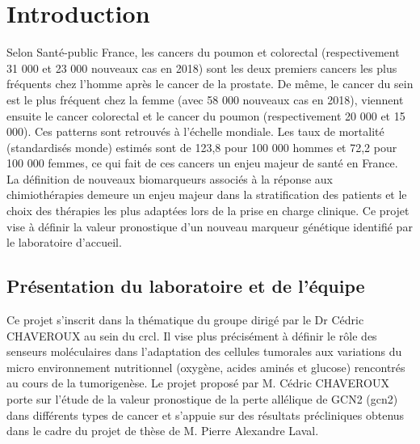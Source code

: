 \documentclass{style}
\begin{document}
\section{Introduction}
Selon Santé-public France, les cancers du poumon et colorectal (respectivement 31 000 et 23 000 nouveaux cas en 2018) sont les deux premiers cancers les plus fréquents chez l’homme après le cancer de la prostate. De même, le cancer du sein est le plus fréquent chez la femme (avec 58 000 nouveaux cas en 2018), viennent ensuite le cancer colorectal et le cancer du poumon (respectivement 20 000 et 15 000). Ces patterns sont retrouvés à l’échelle mondiale. Les taux de mortalité (standardisés monde) estimés sont de 123,8 pour 100 000 hommes et 72,2 pour 100 000 femmes, ce qui fait de ces cancers un enjeu majeur de santé en France.
La définition de nouveaux biomarqueurs associés à la réponse aux chimiothérapies demeure un enjeu majeur dans la stratification des patients et le choix des thérapies les plus adaptées lors de la prise en charge clinique. Ce projet vise à définir la valeur pronostique d’un nouveau marqueur génétique identifié par le laboratoire d’accueil.

\subsection{Présentation du laboratoire et de l’équipe}
Ce projet s’inscrit dans la thématique du groupe dirigé par le Dr Cédric CHAVEROUX au sein du \acrfull{crcl}. Il vise plus précisément à définir le rôle des senseurs moléculaires dans l’adaptation des cellules tumorales aux variations du micro environnement nutritionnel (oxygène, acides aminés et glucose) rencontrés au cours de la tumorigenèse. Le projet proposé par M. Cédric CHAVEROUX porte sur l’étude de la valeur pronostique de la perte allélique de GCN2 (\acrlong{gcn2}) dans différents types de cancer et s’appuie sur des résultats précliniques obtenus dans le cadre du projet de thèse de M. Pierre Alexandre Laval.
\end{document}
